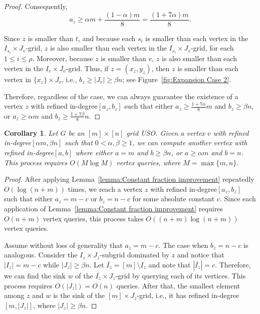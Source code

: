 \documentclass[a4paper,10pt]{article}
\newtheorem{corollary}{Corollary}
\newcommand{\indegree}{refined in-degree\xspace}
\begin{document}
\begin{proof}
Consequently, 
$$a_z \geq \alpha m + \frac{(1-\alpha)m}{8} = \frac{(1 + 7\alpha) m}{8}.$$

Since $z$ is smaller than $t$, and 
because each $s_i$ is smaller than each vertex in the $I_{s_i}\times J_v$-grid, $z$ is also smaller than each vertex in the $I_{s_i}\times J_v$-grid, for each $1\leq i\leq \rho$. 
Moreover, because $z$ is smaller than $v$, $z$ is also smaller than each vertex in the $I_v\times J_v$-grid.
Thus, if $z = (x_z, y_z)$, then $z$ is smaller than each vertex in $\{x_z\}\times J_v$, i.e., $b_z \geq |J_v| \geq \beta n$; see Figure~\ref{fig:Expansion Case 2}.

Therefore, regardless of the case, we can always guarantee the existence of a vertex $z$ with \indegree $[a_z,b_z]$ such that either $a_z\geq \frac{1+7\alpha}{8}m$ and $b_z \geq \beta n$, or $a_z \geq \alpha m$ and $b_z \geq \frac{1 + 7\beta}{8}n$.
\end{proof}



\begin{corollary}\label{corollary:Expansion to the wall}
Let $G$ be an $[m]\times[n]$ grid USO. 
Given a vertex $v$ with \indegree $[\alpha m, \beta n]$ such that $0 < \alpha, \beta \geq 1$, we can compute another vertex with \indegree $[a,b]$ where either $a = m$ and $b \geq \beta n$, or $a \geq \alpha m$ and $b  = n$. This process requires $O(M \log M)$ vertex queries, where $M = \max\{m,n\}$.
\end{corollary}
\begin{proof}
After applying Lemma~\ref{lemma:Constant fraction improvement} repeatedly $O(\log(n + m))$ times, we reach a vertex $z$ with \indegree $[a_z, b_z]$ such that either $a_z = m - c$ or $b_z = n- c$ for some absolute constant $c$. 
Since each application of Lemma~\ref{lemma:Constant fraction improvement} requires $O(n+m)$ vertex queries, this process takes $O((n + m) \log (n+m))$ vertex queries.

Assume without loss of generality that $a_z = m-c$. The case when $b_z = n-c$ is analogous. 
Consider the  $I_z\times J_z$-subgrid dominated by $z$ and 
notice that $|I_z| = m-c$ while $|J_z| \geq \beta n$. 
Let $\overline{I_z} = [m] \setminus I_z$ and note that $|\overline{I_z}| = c$. Therefore, we can find the sink $w$ of the $\overline{I_z}\times J_z$-grid by querying each of its vertices. This process requires $O(|J_z|) = O(n)$ queries.  After that, the smallest element among $z$ and $w$ is the sink of the $[m]\times J_z$-grid, i.e., it has \indegree $[m, |J_z|]$, where $|J_z|  \geq \beta n$.
\end{proof}
\end{document}
